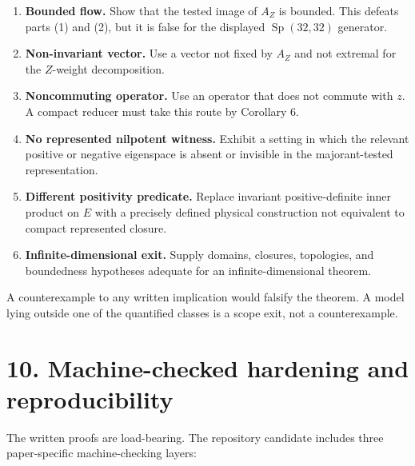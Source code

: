 \documentclass[
  10pt,
  letterpaper,
  oneside]{scrartcl}
\providecommand{\tightlist}{%
  \setlength{\itemsep}{0pt}\setlength{\parskip}{0pt}}
\begin{document}
\begin{enumerate}
\def\labelenumi{\arabic{enumi}.}
\tightlist
\item
  \textbf{Bounded flow.} Show that the tested image of \(A_Z\) is
  bounded. This defeats parts (1) and (2), but it is false for the
  displayed \(\operatorname{Sp}(32,32)\) generator.
\item
  \textbf{Non-invariant vector.} Use a vector not fixed by \(A_Z\) and
  not extremal for the \(Z\)-weight decomposition.
\item
  \textbf{Noncommuting operator.} Use an operator that does not commute
  with \(z\). A compact reducer must take this route by Corollary 6.
\item
  \textbf{No represented nilpotent witness.} Exhibit a setting in which
  the relevant positive or negative eigenspace is absent or invisible in
  the majorant-tested representation.
\item
  \textbf{Different positivity predicate.} Replace invariant
  positive-definite inner product on \(E\) with a precisely defined
  physical construction not equivalent to compact represented closure.
\item
  \textbf{Infinite-dimensional exit.} Supply domains, closures,
  topologies, and boundedness hypotheses adequate for an
  infinite-dimensional theorem.
\end{enumerate}

A counterexample to any written implication would falsify the theorem. A
model lying outside one of the quantified classes is a scope exit, not a
counterexample.

\section{10. Machine-checked hardening and
reproducibility}\label{machine-checked-hardening-and-reproducibility}

The written proofs are load-bearing. The repository candidate includes
three paper-specific machine-checking layers:
\end{document}
